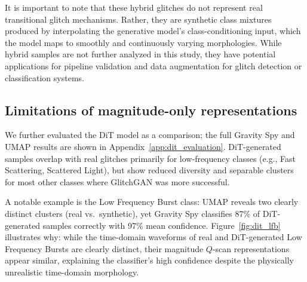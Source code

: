 \documentclass[reprint,nofootinbib,amsmath,amssymb,aps,floatfix]{revtex4-2}
\begin{document}
It is important to note that these hybrid glitches do not represent real transitional glitch mechanisms. 
Rather, they are synthetic class mixtures produced by interpolating the generative model's class-conditioning input, which the model maps to smoothly and continuously varying morphologies.
While hybrid samples are not further analyzed in this study, they have potential applications for pipeline validation and data augmentation for glitch detection or classification systems.


\subsection{Limitations of magnitude-only representations}

We further evaluated the DiT model as a comparison; the full Gravity Spy and UMAP results are shown in Appendix~\ref{app:dit_evaluation}.
DiT-generated samples overlap with real glitches primarily for low-frequency classes (e.g., Fast Scattering, Scattered Light), but show reduced diversity and separable clusters for most other classes where GlitchGAN was more successful.

A notable example is the Low Frequency Burst class: UMAP reveals two clearly distinct clusters (real vs.\ synthetic), yet Gravity Spy classifies 87\% of DiT-generated samples correctly with 97\% mean confidence.
Figure~\ref{fig:dit_lfb} illustrates why: while the time-domain waveforms of real and DiT-generated Low Frequency Bursts are clearly distinct, their magnitude $Q$-scan representations appear similar, explaining the classifier's high confidence despite the physically unrealistic time-domain morphology.

\end{document}
